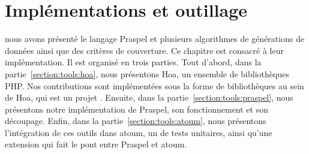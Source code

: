\chapter{Implémentations et outillage}
\label{chapter:tools}

\mminitoc

 nous avons présenté
le langage Praspel et plusieurs algorithmes de générations de données ainsi que
des critères de couverture. Ce chapitre est consacré à leur implémentation. Il
est organisé en trois parties. Tout d'abord, dans la
partie~\ref{section:tools:hoa}, nous présentons Hoa, un ensemble de
bibliothèques PHP. Nos contributions sont implémentées sous la forme de
bibliothèques au sein de Hoa, qui est un projet .
Ensuite, dans la partie~\ref{section:tools:praspel}, nous présentons notre
implémentation de Praspel, son fonctionnement et son découpage. Enfin, dans la
partie~\ref{section:tools:atoum}, nous présentons l'intégration de ces outils
dans atoum, un  de tests unitaires, ainsi qu'une extension
qui fait le pont entre Praspel et atoum.


